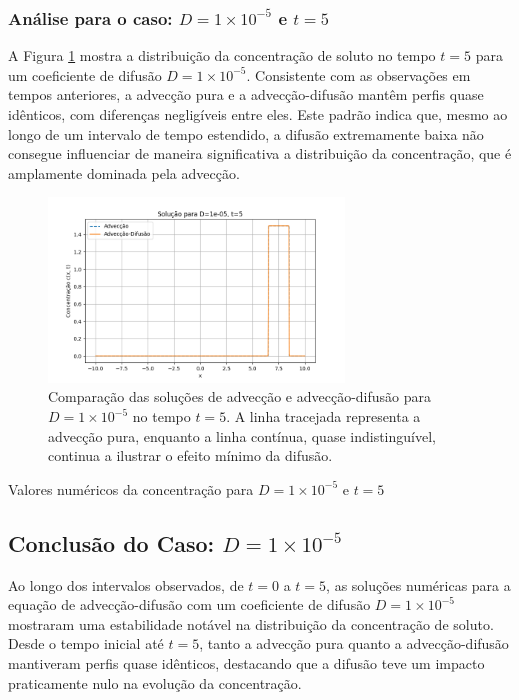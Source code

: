 \subsubsection{Análise para o caso: \( D = 1 \times 10^{-5} \) e \( t = 5 \)}
A Figura \ref{fig:advec_diffus_1e-05_t5} mostra a distribuição da concentração de soluto no tempo \( t = 5 \) para um coeficiente de difusão \( D = 1 \times 10^{-5} \). Consistente com as observações em tempos anteriores, a advecção pura e a advecção-difusão mantêm perfis quase idênticos, com diferenças negligíveis entre eles. Este padrão indica que, mesmo ao longo de um intervalo de tempo estendido, a difusão extremamente baixa não consegue influenciar de maneira significativa a distribuição da concentração, que é amplamente dominada pela advecção.

\begin{figure}[H]
    \centering
    \includegraphics[width=0.7\textwidth]{code/plot/Advec_Difus_t5_D1e-05.png}
    \caption{Comparação das soluções de advecção e advecção-difusão para \( D = 1 \times 10^{-5} \) no tempo \( t = 5 \). A linha tracejada representa a advecção pura, enquanto a linha contínua, quase indistinguível, continua a ilustrar o efeito mínimo da difusão.}
    \label{fig:advec_diffus_1e-05_t5}
\end{figure}

\begin{table}[H]
    \centering
    \caption{Valores numéricos da concentração para \( D = 1 \times 10^{-5} \) e \( t = 5 \)}
    
\end{table}



\subsection*{Conclusão do Caso: \( D = 1 \times 10^{-5} \)}
Ao longo dos intervalos observados, de \( t = 0 \) a \( t = 5 \), as soluções numéricas para a equação de advecção-difusão com um coeficiente de difusão \( D = 1 \times 10^{-5} \) mostraram uma estabilidade notável na distribuição da concentração de soluto. Desde o tempo inicial até \( t = 5 \), tanto a advecção pura quanto a advecção-difusão mantiveram perfis quase idênticos, destacando que a difusão teve um impacto praticamente nulo na evolução da concentração.

